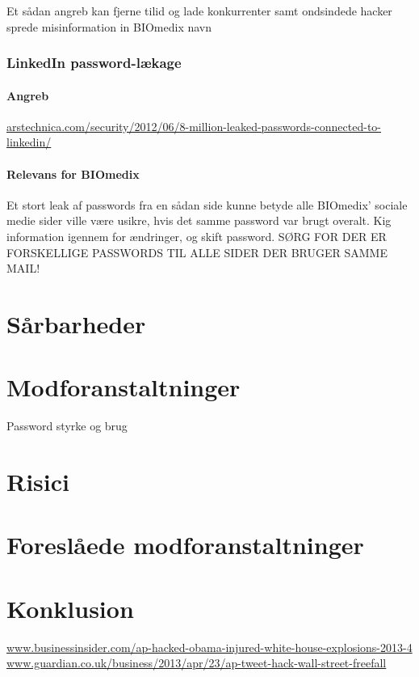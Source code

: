 \documentclass{article}
\begin{document}
Et sådan angreb kan fjerne tilid og lade konkurrenter samt ondsindede hacker sprede misinformation in BIOmedix navn 
\subsubsection{LinkedIn password-lækage}

\paragraph{Angreb}
\url{arstechnica.com/security/2012/06/8-million-leaked-passwords-connected-to-linkedin/}
\paragraph{Relevans for BIOmedix}

Et stort leak af passwords fra en sådan side kunne betyde alle BIOmedix' sociale medie sider ville være usikre, hvis det samme password var brugt overalt. Kig information igennem for ændringer, og skift password. SØRG FOR DER ER FORSKELLIGE PASSWORDS TIL ALLE SIDER DER BRUGER SAMME MAIL! 

\section{Sårbarheder}



\section{Modforanstaltninger}

Password styrke og brug

\section{Risici}



\section{Foreslåede modforanstaltninger}



\section{Konklusion}


\newpage
\begin{thebibliography}{100}


\url{www.businessinsider.com/ap-hacked-obama-injured-white-house-explosions-2013-4}
\url{www.guardian.co.uk/business/2013/apr/23/ap-tweet-hack-wall-street-freefall}
\end{thebibliography}
\end{document}
